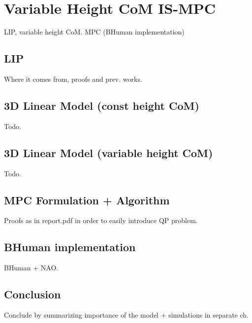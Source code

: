 \chapter{Variable Height CoM IS-MPC}
LIP, variable height CoM. MPC (BHuman implementation)

\section{LIP}
Where it comes from, proofs and prev. works.

\section{3D Linear Model (const height CoM)}
Todo.

\section{3D Linear Model (variable height CoM)}
Todo.

\section{MPC Formulation + Algorithm}
Proofs as in report.pdf in order to easily introduce QP problem.

\section{BHuman implementation}
BHuman + NAO.

\section{Conclusion}
Conclude by summarizing importance of the model + simulations in
separate ch.

